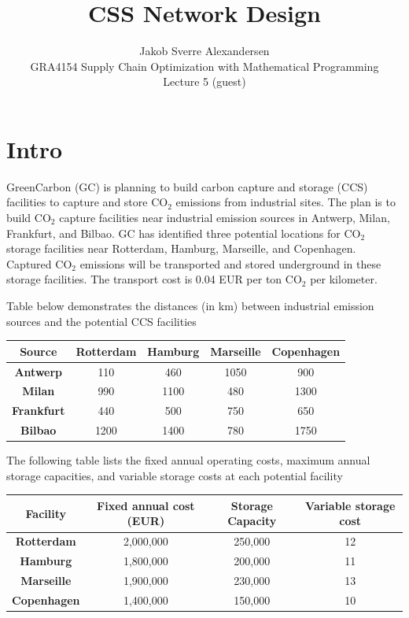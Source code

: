 \documentclass[10pt]{article}
\begin{document}
 
\title{CSS Network Design}
\author{Jakob Sverre Alexandersen\\
GRA4154 Supply Chain Optimization with Mathematical Programming\\
Lecture 5 (guest)}
\maketitle

\tableofcontents
\newpage

\section{Intro}
GreenCarbon (GC) is planning to build carbon capture and storage (CCS) facilities to capture
and store CO$_2$ emissions from industrial sites. The plan is to build CO$_2$ capture facilities near
industrial emission sources in Antwerp, Milan, Frankfurt, and Bilbao. GC has identified three
potential locations for CO$_2$ storage facilities near Rotterdam, Hamburg, Marseille, and
Copenhagen. Captured CO$_2$ emissions will be transported and stored underground in these
storage facilities. The transport cost is 0.04 EUR per ton CO$_2$ per kilometer.

Table below demonstrates the distances (in km) between industrial emission sources and the
potential CCS facilities
\begin{center}
    \begin{tabular}{|c|c|c|c|c|}
        \hline 
        \textbf{Source} & \textbf{Rotterdam} & \textbf{Hamburg} & \textbf{Marseille} & \textbf{Copenhagen}\\\hline 
        \textbf{Antwerp} & 110 & 460 & 1050 & 900\\\hline
        \textbf{Milan} & 990 & 1100 & 480 & 1300\\\hline
        \textbf{Frankfurt} & 440 & 500 & 750 & 650\\\hline
        \textbf{Bilbao} & 1200 & 1400 & 780 & 1750\\\hline
    \end{tabular}
\end{center}

The following table lists the fixed annual operating costs, maximum annual storage capacities,
and variable storage costs at each potential facility
\begin{center}
    \begin{tabular}{|c|c|c|c|}
        \hline 
        \textbf{Facility} & \textbf{Fixed annual cost (EUR)} & \textbf{Storage Capacity} & \textbf{Variable storage cost}\\\hline 
        \textbf{Rotterdam} & 2,000,000 & 250,000 & 12\\\hline
        \textbf{Hamburg} & 1,800,000 & 200,000 & 11\\\hline
        \textbf{Marseille} & 1,900,000 & 230,000 & 13\\\hline
        \textbf{Copenhagen} & 1,400,000 & 150,000 & 10\\\hline
    \end{tabular}
\end{center}
\end{document}
